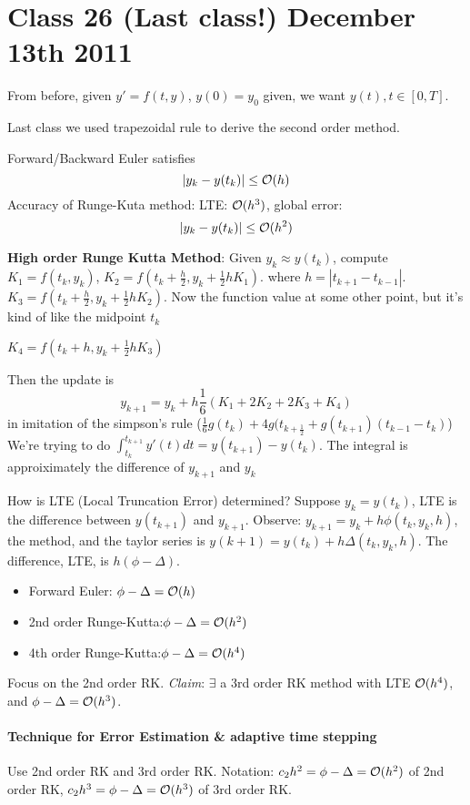 \pagebreak

\section{Class 26 (Last class!) December 13th 2011}
From before, given $y'=f(t,y)$, $y(0)=y_0$ given, we want $y(t), t\in
[0,T]$.

Last class we used trapezoidal rule to derive the second order method.

Forward/Backward Euler satisfies $$|y_k-y(t_k)| \le \mathcal{O}(h)$$
Accuracy of Runge-Kuta method:
LTE: $\mathcal{O}(h^3)$, global error: $$|y_k-y(t_k)| \le \mathcal{O}(h^2)$$

\textbf{High order Runge Kutta Method}:
Given $y_k\approx y(t_k)$, compute $K_1=f(t_k,y_k)$, $K_2 =f(t_k
+\frac{h}{2}, y_k + \frac{1}{2}hK_1)$.
 where $h=|t_{k+1} - t_{k-1}|$.
$K_3 = f(t_k + \frac{h}{2}, y_k + \frac{1}{2}hK_2)$. Now the function
value at some other point, but it's kind of like the midpoint $t_k$

$K_4 = f(t_k + h, y_k + \frac{1}{2}hK_3)$

Then the update is $$y_{k+1} = y_k + h\frac{1}{6}(K_1+2K_2+2K_3+K_4)$$
in imitation of the simpson's rule ($\frac{1}{6}g(t_k) +
4g(t_{k+\frac{1}{2}}+g(t_{k+1})(t_{k-1}-t_k)$)
We're trying to do $\int_{t_k}^{t_{k+1}}y'(t)dt = y(t_{k+1}) -
y(t_k)$.
The integral is approiximately the difference of $y_{k+1}$ and $y_k$

How is LTE (Local Truncation Error) determined?
Suppose $y_k=y(t_k)$, LTE is the difference between $y(t_{k+1})$ and
$y_{k+1}$. 
Observe: $y_{k+1} = y_k + h\phi(t_k,y_k,h)$, the method, and the taylor
series is $y(k+1) = y(t_k) + h\Delta(t_k,y_k,h)$. The difference, LTE,
is $h(\phi-\Delta)$.

\begin{itemize}
\item Forward Euler: $\phi-\Delta = \mathcal{O}(h)$
\item 2nd order Runge-Kutta:$\phi-\Delta = \mathcal{O}(h^2)$
\item 4th order Runge-Kutta:$\phi-\Delta = \mathcal{O}(h^4)$
\end{itemize}

Focus on the 2nd order RK. \emph{Claim}: $\exists$ a 3rd order RK
method with LTE $\mathcal{O}(h^4)$, and $\phi-\Delta = \mathcal{O}(h^3)$.

\paragraph{Technique for Error Estimation \& adaptive time stepping}
Use 2nd order RK and 3rd order RK. Notation: $c_2h^2=\phi-\Delta =
\mathcal{O}(h^2)$ of 2nd order RK, $c_2h^3=\phi-\Delta =\mathcal{O}(h^3)$ of 3rd order
RK.

